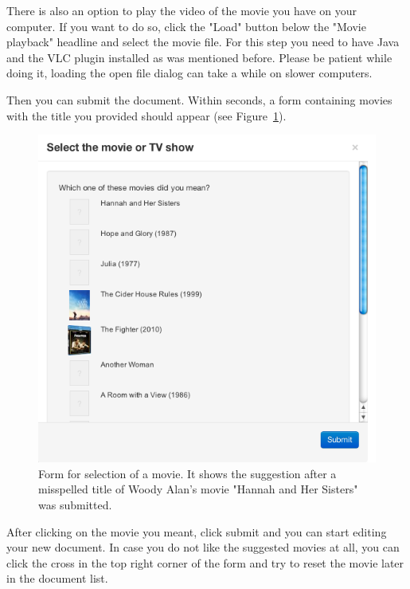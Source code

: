There is also an option to play the video of the movie you have on your computer. If you want to do so, click the "Load" button below the "Movie playback" headline and select the movie file. For this step you need to have Java and the VLC plugin installed as was mentioned before. Please be patient while doing it, loading the open file dialog can take a while on slower computers. 


Then you can submit the document. Within seconds, a form containing movies with the title you provided should appear (see Figure~\ref{fig:media_sources}).

\begin{figure}[h]
\begin{center}
\includegraphics[scale=0.4]{figures/user_manual/media_sources.png}
\end{center}
\caption{Form for selection of a movie. It shows the suggestion after a misspelled title of Woody Alan's movie "Hannah and Her Sisters" was submitted.}
\label{fig:media_sources}
\end{figure}

After clicking on the movie you meant, click submit and you can start editing your new document. In case you do not like the suggested movies at all, you can click the cross in the top right corner of the form and try to reset the movie later in the document list.

